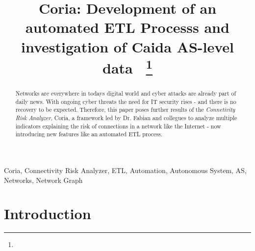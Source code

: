 \documentclass[conference, 11pt]{IEEEtran}
\begin{document}
			  
			  
\title{Coria: Development of an automated ETL Processs and investigation of Caida AS-level data\
{\footnotesize \textsuperscript{}}
\thanks{}
}

\author{
\and
{}
}

\maketitle
\thispagestyle{plain}
\pagestyle{plain}



\begin{abstract}
Networks are everywhere in todays digital world and cyber attacks are already part of daily news. With ongoing cyber threats the need for IT security rises - and there is no recovery to be expected. Therefore, this paper poses further results of the \textit{Connetivity Risk Analyzer}, Coria, a framework led by Dr. Fabian and collegues to analyze multiple indicators explaining the risk of connections in a network like the Internet - now introducing new features like an automated ETL process.

\end{abstract}

\begin{IEEEkeywords}
Coria, Connectivity Risk Analyzer, ETL, Automation, Autonomous System, AS, Networks, Network Graph
\end{IEEEkeywords}


\section{Introduction}
\end{document}
